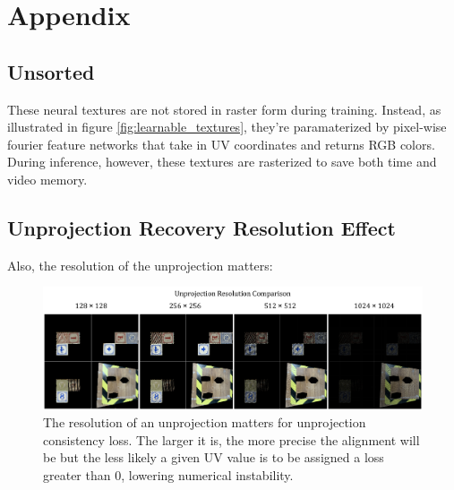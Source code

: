 \documentclass{article}
\begin{document}

\clearpage
\acknowledgments{}








\clearpage

\section{Appendix} 
\label{sec:appendix}

    \subsection{Unsorted}
     	These neural textures are not stored in raster form during training. Instead, as illustrated in figure \ref{fig:learnable_textures}, they're paramaterized by pixel-wise fourier feature networks \cite{fourier_feature_networks} that take in UV coordinates and returns RGB colors. During inference, however, these textures are rasterized to save both time and video memory.

	\subsection*{Unprojection Recovery Resolution Effect}

		Also, the resolution of the unprojection matters:



		\begin{figure}[H]
			\begin{center}
				\includegraphics[width=400pt]{../images/unprojection_resolution_comparison.pdf}
			\end{center}
			\caption{
				The resolution of an unprojection matters for unprojection consistency loss. The larger it is, the more precise the alignment will be but the less likely a given UV value is to be assigned a loss greater than 0, lowering numerical instability.
			}
			\label{fig:unprojection_resolution_comparison}
		\end{figure}
\end{document}
